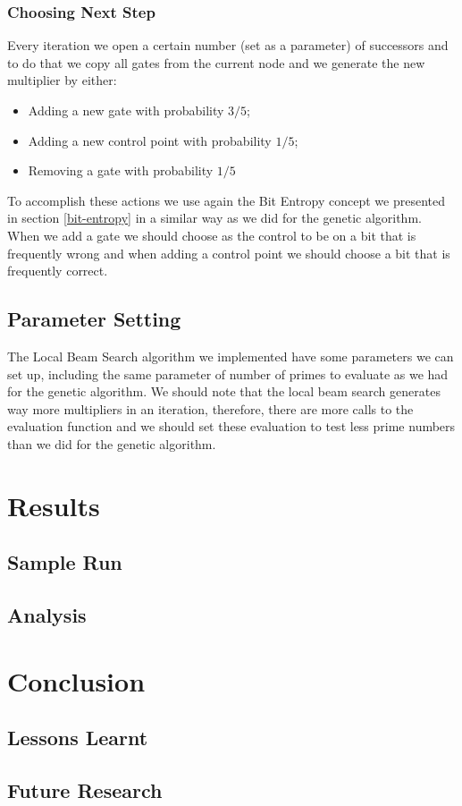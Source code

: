 \documentclass[12pt]{article}
\begin{document}
\subsubsection{Choosing Next Step}
Every iteration we open a certain number (set as a parameter) of successors and to do that we copy all gates from the current node and we generate the new multiplier by either:
\begin{itemize}
    \item{Adding a new gate with probability $3/5$;}
    \item{Adding a new control point with probability $1/5$;}
    \item{Removing a gate with probability $1/5$}
\end{itemize}

To accomplish these actions we use again the Bit Entropy concept we presented in section \ref{bit-entropy} in a similar way as we did for the genetic algorithm. When we add a gate we should choose as the control to be on a bit that is frequently wrong and when adding a control point we should choose a bit that is frequently correct.

\subsection{Parameter Setting}
The Local Beam Search algorithm we implemented have some parameters we can set up, including the same parameter of number of primes to evaluate as we had for the genetic algorithm. We should note that the local beam search generates way more multipliers in an iteration, therefore, there are more calls to the evaluation function and we should set these evaluation to test less prime numbers than we did for the genetic algorithm.

\section{Results}

\subsection{Sample Run}
\subsection{Analysis}


\section{Conclusion}
\subsection{Lessons Learnt}
\subsection{Future Research}
\end{document}
